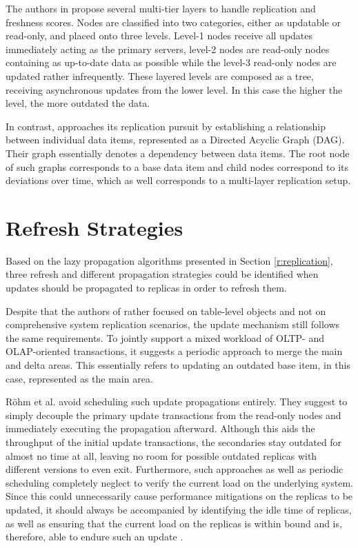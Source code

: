 The authors in \cite{voicu:2010} propose several multi-tier layers to handle replication and freshness scores. 
Nodes are classified into two categories, either as updatable or read-only, and placed onto three levels.
Level-1 nodes receive all updates immediately acting as the primary servers, level-2 nodes are read-only nodes containing as up-to-date data as possible while the
level-3 read-only nodes are updated rather infrequently. These layered levels are composed as a tree, receiving asynchronous updates from the lower level. 
In this case the higher the level, the more outdated the data.

In contrast, \cite{xiang:2008} approaches its replication pursuit by establishing a relationship between individual data items, represented as a Directed Acyclic Graph (DAG).
Their graph essentially denotes a dependency between data items. The root node of such graphs corresponds to a base data item and child nodes correspond 
to its deviations over time, which as well corresponds to a multi-layer replication setup.





\section{Refresh Strategies}
\label{r:strategies}
Based on the lazy propagation algorithms presented in Section \ref{r:replication}, three refresh and different propagation strategies could be identified when updates should be propagated 
to replicas in order to refresh them.

Despite that the authors of \cite{psaroudakis:2015} rather focused on table-level objects and not on comprehensive system replication scenarios, the update mechanism 
still follows the same requirements. To jointly support a mixed workload of OLTP- and OLAP-oriented transactions,
it suggests a periodic approach to merge the main and delta areas. This essentially refers to updating an outdated base item, in this case, represented as the main area.

Röhm et al. \cite{rohm:2002} avoid scheduling such update propagations entirely. They suggest to simply decouple the primary update transactions from the read-only nodes
and immediately executing the propagation afterward. Although this aids the throughput of the initial update transactions, the secondaries 
stay outdated for almost no time at all, leaving no room for possible outdated replicas with different versions to even exit. 
Furthermore, such approaches as well as periodic scheduling completely neglect to verify the current load on the underlying system.
Since this could unnecessarily cause performance mitigations on the replicas to be updated, it should always be accompanied by identifying the idle time of replicas, as well 
as ensuring that the current load on the replicas is within bound and is, therefore, able to endure such an update \cite{voicu:2010}.

